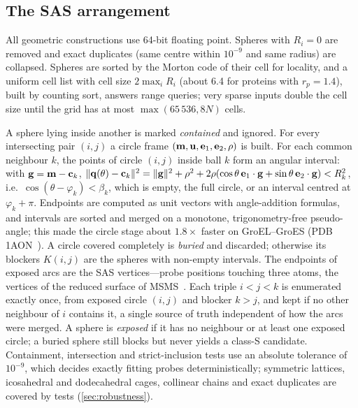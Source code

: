 \subsection{The SAS arrangement}
\label{sec:arrangement}

All geometric constructions use 64-bit floating point. Spheres with
$R_i = 0$ are removed and exact duplicates (same centre within
$10^{-9}$\Ang{} and same radius) are collapsed. Spheres are sorted by the
Morton code of their cell for locality, and a uniform cell list with cell
size $2\max_i R_i$ (about 6.4\Ang{} for proteins with $r_p = 1.4$\Ang),
built by counting sort, answers range queries; very sparse inputs double the
cell size until the grid has at most $\max(65\,536, 8N)$ cells.

A sphere lying inside another is marked \emph{contained} and ignored.
For every intersecting pair $(i,j)$ a circle frame
$(\mathbf{m}, \mathbf{u}, \mathbf{e}_1, \mathbf{e}_2, \rho)$ is built. For each common
neighbour $k$, the points of circle $(i,j)$ inside ball $k$ form an angular
interval: with $\mathbf{g} = \mathbf{m} - \mathbf{c}_k$,
$\lVert\mathbf{q}(\theta) - \mathbf{c}_k\rVert^2 = \lVert\mathbf{g}\rVert^2 + \rho^2 +
2\rho(\cos\theta\, \mathbf{e}_1\cdot\mathbf{g} + \sin\theta\, \mathbf{e}_2\cdot\mathbf{g})
< R_k^2$, i.e.\ $\cos(\theta - \varphi_k) < \beta_k$, which is empty, the
full circle, or an interval centred at $\varphi_k + \pi$. Endpoints are
computed as unit vectors with angle-addition formulas, and intervals are
sorted and merged on a monotone, trigonometry-free pseudo-angle; this made
the circle stage about $1.8\times$ faster on GroEL--GroES (PDB 1AON~\cite{pdb1aon}). A
circle covered completely is \emph{buried} and discarded; otherwise its
blockers $K(i,j)$ are the spheres with non-empty intervals. The endpoints of
exposed arcs are the SAS vertices---probe positions touching three atoms,
the vertices of the reduced surface of MSMS~\cite{sanner1996}. Each triple
$i < j < k$ is enumerated exactly once, from exposed circle $(i,j)$ and
blocker $k > j$, and kept if no other neighbour of $i$ contains it, a single
source of truth independent of how the arcs were merged. A sphere is
\emph{exposed} if it has no neighbour or at least one exposed circle; a
buried sphere still blocks but never yields a class-S candidate. Containment,
intersection and strict-inclusion tests use an absolute tolerance of
$10^{-9}$\Ang, which decides exactly fitting probes deterministically;
symmetric lattices, icosahedral and dodecahedral cages, collinear chains and
exact duplicates are covered by tests (\cref{sec:robustness}).

